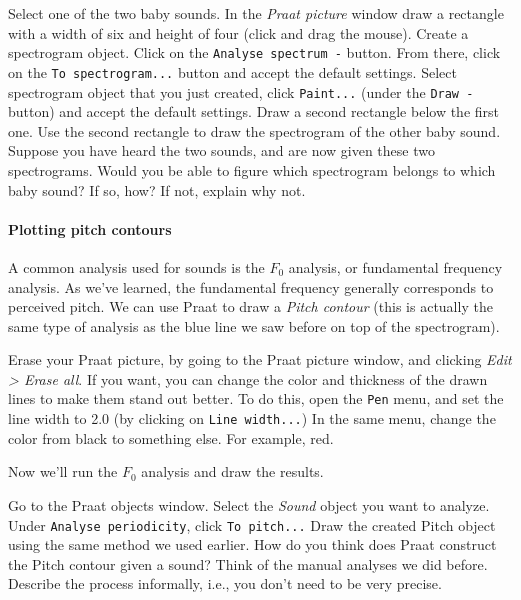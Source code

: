 \documentclass[a4paper, 9pt]{article}
\begin{document}
\begin{exercise}
\action Select one of the two baby sounds.
\action In the \textit{Praat picture} window draw a rectangle with a width of six and height of four (click and drag the mouse).
\action Create a spectrogram object. Click on the \texttt{Analyse spectrum -} button. From there, click on the \texttt{To spectrogram...} button and accept the default settings.
\action Select spectrogram object that you just created, click \texttt{Paint...} (under the \texttt{Draw - } button) and accept the default settings.
\action Draw a second rectangle below the first one. Use the second rectangle to draw the spectrogram of the other baby sound.
\action Suppose you have heard the two sounds, and are now given these two spectrograms. Would you be able to figure which spectrogram belongs to which baby sound? If so, how? If not, explain why not.
\end{exercise}

\paragraph{Plotting pitch contours} A common analysis used for sounds is the $F_0$ analysis, or fundamental frequency analysis. As we've learned, the fundamental frequency generally corresponds to perceived pitch. We can use Praat to draw a
\emph{Pitch contour} (this is actually the same type of analysis as the blue line we saw before on top of the spectrogram).

\begin{exercise}
\action Erase your Praat picture, by going to the Praat picture window, and clicking \emph{Edit > Erase all}.
\action If you want, you can change the color and thickness of the drawn lines to make them stand out better. To do this, open the \texttt{Pen} menu, and set the line width to 2.0 (by clicking on \texttt{Line width...})
\action In the same menu, change the color from black to something else. For example, red. 
\end{exercise}

Now we'll run the $F_0$ analysis and draw the results.

\begin{exercise}
\action Go to the Praat objects window.
\action Select the \emph{Sound} object you want to analyze.
\action Under \texttt{Analyse periodicity}, click \texttt{To pitch...}
\action Draw the created Pitch object using the same method we used earlier.
\askstar How do you think does Praat construct the Pitch contour given a sound? Think of the manual analyses we did before. Describe the process informally, i.e., you don't need to be very precise.
\end{exercise}
\end{document}
